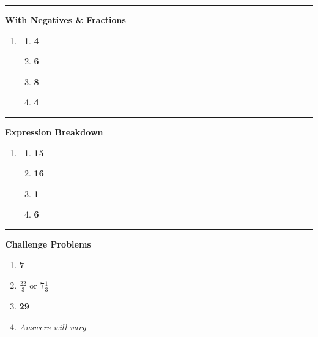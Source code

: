 \documentclass[
  letterpaper,
  DIV=11,
  numbers=noendperiod]{scrreprt}
\providecommand{\tightlist}{%
  \setlength{\itemsep}{0pt}\setlength{\parskip}{0pt}}
\begin{document}
\begin{center}\rule{0.5\linewidth}{0.5pt}\end{center}

\textbf{With Negatives \& Fractions}

\begin{enumerate}
\def\labelenumi{\arabic{enumi}.}
\setcounter{enumi}{1}
\tightlist
\item
  \begin{enumerate}
  \def\labelenumii{\alph{enumii}.}
  \tightlist
  \item
    \textbf{4}
  \item
    \textbf{6}
  \item
    \textbf{8}
  \item
    \textbf{4}
  \end{enumerate}
\end{enumerate}

\begin{center}\rule{0.5\linewidth}{0.5pt}\end{center}

\textbf{Expression Breakdown}

\begin{enumerate}
\def\labelenumi{\arabic{enumi}.}
\setcounter{enumi}{2}
\tightlist
\item
  \begin{enumerate}
  \def\labelenumii{\alph{enumii}.}
  \tightlist
  \item
    \textbf{15}
  \item
    \textbf{16}
  \item
    \textbf{1}
  \item
    \textbf{6}
  \end{enumerate}
\end{enumerate}

\begin{center}\rule{0.5\linewidth}{0.5pt}\end{center}

\textbf{Challenge Problems}

\begin{enumerate}
\def\labelenumi{\arabic{enumi}.}
\setcounter{enumi}{3}
\item
  \textbf{7}
\item
  \textbf{\(\frac{22}{3}\)} or \textbf{\(7\frac{1}{3}\)}
\item
  \textbf{29}
\item
  \emph{Answers will vary}
\end{enumerate}
\end{document}

